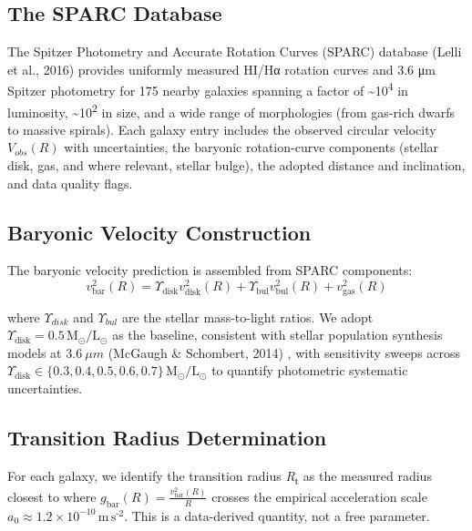\documentclass[11pt]{article}
\begin{document}
\subsection{The SPARC Database}\label{the-sparc-database}

The Spitzer Photometry and Accurate Rotation Curves (SPARC) database (Lelli et al., 2016) provides uniformly measured HI/Hα rotation curves and 3.6 μm Spitzer photometry for 175 nearby galaxies spanning a factor of \textasciitilde10\textsuperscript{4} in luminosity, \textasciitilde10\textsuperscript{2} in size, and a wide range of morphologies (from gas-rich dwarfs to massive spirals). Each galaxy entry includes the observed circular velocity \(V_{obs}(R)\) with uncertainties, the baryonic rotation-curve components (stellar disk, gas, and where relevant, stellar bulge), the adopted distance and inclination, and data quality flags.

\subsection{Baryonic Velocity Construction}\label{baryonic-velocity-construction}

The baryonic velocity prediction is assembled from SPARC components:
\begin{equation*}
v_{\text{bar}}^{2}(R) = \Upsilon_{\text{disk}} v_{\text{disk}}^{2}(R) + \Upsilon_{\text{bul}} v_{\text{bul}}^{2}(R) + v_{\text{gas}}^{2}(R)
\end{equation*}

where \(\Upsilon_{disk}\) and \(\Upsilon_{bul}\) are the stellar mass-to-light ratios. We adopt \(\Upsilon_{\text{disk}} = 0.5\,\text{M}_{\text{⊙}}\text{/}\text{L}_{\text{⊙}}\) as the baseline, consistent with stellar population synthesis models at \(3.6\ \mu m\) (McGaugh \& Schombert, 2014) \citep{McGaugh2014}, with sensitivity sweeps across \(\Upsilon_{\text{disk}} \in \text{\{}0.3,0.4,0.5,0.6,0.7\text{\}}\,\text{M}_{\text{⊙}}\text{/}\text{L}_{\text{⊙}}\) to quantify photometric systematic uncertainties.

\subsection{Transition Radius Determination}\label{transition-radius-determination}

For each galaxy, we identify the transition radius \emph{R}\textsubscript{t} as the measured radius closest to where \(g_{\text{bar}}(R) = \frac{v_{\text{bar}}^{2}(R)}{R}\) crosses the empirical acceleration scale \(a_{0} \approx 1.2 \times 10^{- 10}\,\text{m}\,\text{s}^{\text{-2}}\). This is a data-derived quantity, not a free parameter.
\end{document}
